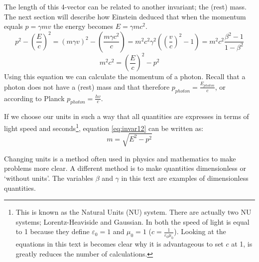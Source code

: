 The length of this 4-vector can be related to another invariant; the (rest) mass. The next section will describe how Einstein deduced that when the momentum equals $p=\gamma mv$ the energy becomes $E=\gamma m c^2$. 
\begin{equation}\label{eq:invar11}
p^2-\left( \frac{E}{c}\right)^2 =(m \gamma v)^2 -\left(\frac{m \gamma c^2}{c} \right) = m^2 c^2 \gamma^2 \left( \left( \frac{v}{c}\right)^2 -1 \right) = 	m^2 c^2 \frac{\beta^2 -1 }{1-\beta^2}
\end{equation}
\begin{equation}\label{eq:invar12}
m^2 c^2 =\left( \frac{E}{c} \right)^2 - p^2
\end{equation}
Using this equation we can calculate the momentum of a photon. Recall that a photon does not have a (rest) mass and that therefore $p_{{photon}}=\frac{E_{{photon}}}{c}$, or according to Planck $p_{photon}=\frac{hv}{c}$.

If we choose our units in such a way that all quantities are expresses in terms of light speed and seconds\footnote{This is known as the Natural Units (NU) system. There are actually two NU systems; Lorentz-Heaviside and Gaussian. In both the speed of light is equal to 1 because they define $\varepsilon_0=1$ and $\mu_0=1$ ($c=\frac{1}{\varepsilon_0 \mu_0}$). Looking at the equations in this text is becomes clear why it is advantageous to set $c$ at 1, is greatly reduces the number of calculations.}, equation \ref{eq:invar12} can be written as:
\begin{equation}\label{eq:invar13}
m=\sqrt{E^2-p^2}
\end{equation}

Changing units is a method often used in physics and mathematics to make problems more clear. A different method is to make quantities dimensionless or `without units'. The variables $\beta$ and $\gamma$ in this text are examples of dimensionless quantities.

